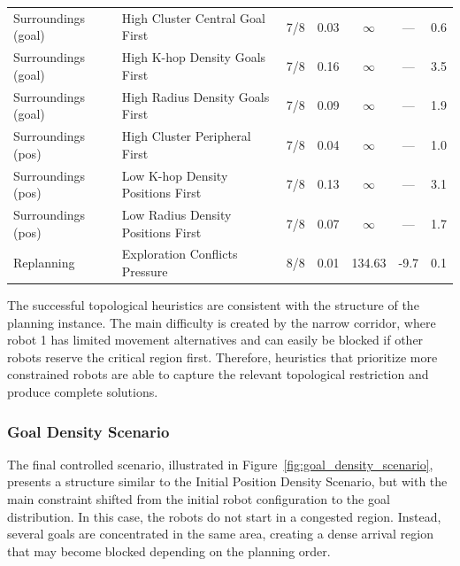 \begin{table}[H]
\begin{tabular}{@{}llccccc@{}}
Surroundings (goal) & High Cluster Central Goal First & 7/8 & 0.03 & $\infty$ & --- & 0.6 \\
Surroundings (goal) & High K-hop Density Goals First & 7/8 & 0.16 & $\infty$ & --- & 3.5 \\
Surroundings (goal) & High Radius Density Goals First & 7/8 & 0.09 & $\infty$ & --- & 1.9 \\

\midrule

Surroundings (pos) & High Cluster Peripheral First & 7/8 & 0.04 & $\infty$ & --- & 1.0 \\
Surroundings (pos) & Low K-hop Density Positions First & 7/8 & 0.13 & $\infty$ & --- & 3.1 \\
Surroundings (pos) & Low Radius Density Positions First & 7/8 & 0.07 & $\infty$ & --- & 1.7 \\

\midrule

Replanning & Exploration Conflicts Pressure & 8/8 & 0.01 & 134.63 & -9.7 & 0.1 \\

\bottomrule
\end{tabular}
\end{table}


The successful topological heuristics are consistent with the structure of the planning instance. The
main difficulty is created by the narrow corridor, where robot 1 has limited movement alternatives
and can easily be blocked if other robots reserve the critical region first. Therefore, heuristics that
prioritize more constrained robots are able to capture the relevant topological restriction and
produce complete solutions.

\subsubsection{Goal Density Scenario}
\label{subsubsec:goal_density_scenario}
\hspace{\parindent}
The final controlled scenario, illustrated in Figure~\ref{fig:goal_density_scenario}, presents a
structure similar to the Initial Position Density Scenario, but with the main constraint shifted from
the initial robot configuration to the goal distribution. In this case, the robots do not start in a
congested region. Instead, several goals are concentrated in the same area, creating a dense
arrival region that may become blocked depending on the planning order.

